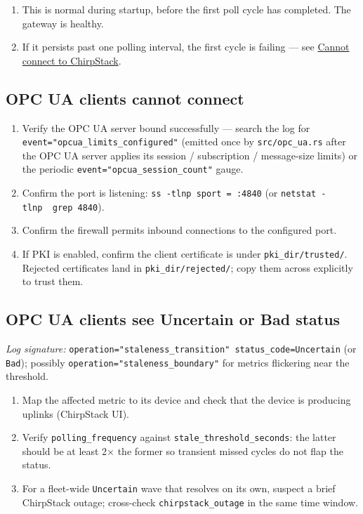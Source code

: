 \begin{enumerate}
\def\labelenumi{\arabic{enumi}.}
\item
  This is normal during startup, before the first poll cycle has completed. The gateway is healthy.
\item
  If it persists past one polling interval, the first cycle is failing --- see \hyperref[sec-issue-chirpstack-connection]{Cannot connect to ChirpStack}.
\end{enumerate}

\subsection{OPC UA clients cannot connect}\label{sec-issue-no-opc-clients}

\begin{enumerate}
\def\labelenumi{\arabic{enumi}.}
\item
  Verify the OPC UA server bound successfully --- search the log for \texttt{event="opcua\_limits\_configured"} (emitted once by \texttt{src/opc\_ua.rs} after the OPC UA server applies its session / subscription / message-size limits) or the periodic \texttt{event="opcua\_session\_count"} gauge.
\item
  Confirm the port is listening: \texttt{ss\ -tlnp\ sport\ =\ :4840} (or \texttt{netstat\ -tlnp\ \textbar{}\ grep\ 4840}).
\item
  Confirm the firewall permits inbound connections to the configured port.
\item
  If PKI is enabled, confirm the client certificate is under \texttt{pki\_dir/trusted/}. Rejected certificates land in \texttt{pki\_dir/rejected/}; copy them across explicitly to trust them.
\end{enumerate}

\subsection{OPC UA clients see Uncertain or Bad status}\label{sec-issue-stale-metrics}

\emph{Log signature:} \texttt{operation="staleness\_transition"\ status\_code=Uncertain} (or \texttt{Bad}); possibly \texttt{operation="staleness\_boundary"} for metrics flickering near the threshold.

\begin{enumerate}
\def\labelenumi{\arabic{enumi}.}
\item
  Map the affected metric to its device and check that the device is producing uplinks (ChirpStack UI).
\item
  Verify \texttt{polling\_frequency} against \texttt{stale\_threshold\_seconds}: the latter should be at least 2× the former so transient missed cycles do not flap the status.
\item
  For a fleet-wide \texttt{Uncertain} wave that resolves on its own, suspect a brief ChirpStack outage; cross-check \texttt{chirpstack\_outage} in the same time window.
\end{enumerate}

